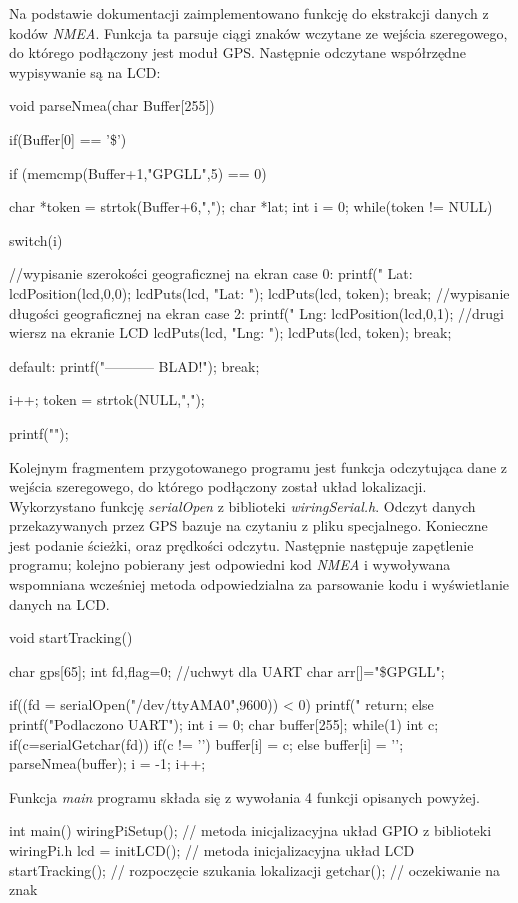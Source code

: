 \documentclass{article}
\begin{document}
		Na podstawie dokumentacji zaimplementowano funkcję do ekstrakcji danych z kodów \textit{NMEA}. Funkcja ta parsuje ciągi znaków wczytane ze wejścia szeregowego, do którego podłączony jest moduł GPS. Następnie odczytane współrzędne wypisywanie są na LCD:
		\begin{verbatimtab}[4]
	void parseNmea(char Buffer[255])
	{
		if(Buffer[0] == '\$')
		{
		if (memcmp(Buffer+1,"GPGLL",5) == 0)
		{
			char *token = strtok(Buffer+6,",");
			char *lat;
			int i = 0;
			while(token != NULL)
			{
				switch(i)
				{
				//wypisanie szerokości geograficznej na ekran
				case 0:
					printf(" Lat: %
					lcdPosition(lcd,0,0); 
					lcdPuts(lcd, "Lat: ");
					lcdPuts(lcd, token);
				    break;
				 //wypisanie długości geograficznej na ekran
				case 2:
					printf(" Lng: %
					lcdPosition(lcd,0,1); //drugi wiersz na ekranie LCD
					lcdPuts(lcd, "Lng: "); 
					lcdPuts(lcd, token);
					break;		
			
				default:
					printf("----------- BLAD!\n");
					break;
				}
				i++;
				token = strtok(NULL,",");
				}
			printf("\n");
			}
		}
	}
	\end{verbatimtab}
	
	Kolejnym fragmentem przygotowanego programu jest funkcja odczytująca dane z wejścia szeregowego, do którego podłączony został układ lokalizacji. Wykorzystano funkcję \textit{serialOpen} z biblioteki \textit{wiringSerial.h}. Odczyt danych przekazywanych przez GPS bazuje na czytaniu z pliku specjalnego. Konieczne jest podanie ścieżki, oraz prędkości odczytu. Następnie następuje zapętlenie programu; kolejno pobierany jest odpowiedni kod \textit{NMEA} i wywoływana wspomniana wcześniej metoda odpowiedzialna za parsowanie kodu i wyświetlanie danych na LCD.
	\begin{verbatimtab}[4]
	void startTracking()
	{
		char gps[65];
		int fd,flag=0; //uchwyt dla UART
		char arr[]="\$GPGLL";

		if((fd = serialOpen("/dev/ttyAMA0",9600)) < 0)
		{
			printf("%
			return;
		} 
		else
		{
			printf("Podlaczono UART\n");
		}
		int i = 0;
		char buffer[255];
		while(1)
		{
		int c;
			if(c=serialGetchar(fd))
			{
				if(c != '\n')
				{
					buffer[i] = c;
				}
				else 
				{
					buffer[i] = '\0';
					parseNmea(buffer);
					i = -1;
				}
				i++;
			}
		}
	}
	\end{verbatimtab}
	
	Funkcja \textit{main} programu składa się z wywołania 4 funkcji opisanych powyżej.
	\begin{verbatimtab}
int main()
{
	wiringPiSetup(); // metoda inicjalizacyjna układ GPIO z biblioteki wiringPi.h  
	lcd = initLCD(); // metoda inicjalizacyjna układ LCD 
	startTracking(); // rozpoczęcie szukania lokalizacji
	getchar(); // oczekiwanie na znak 
}

	\end{verbatimtab}
	
\end{document}
